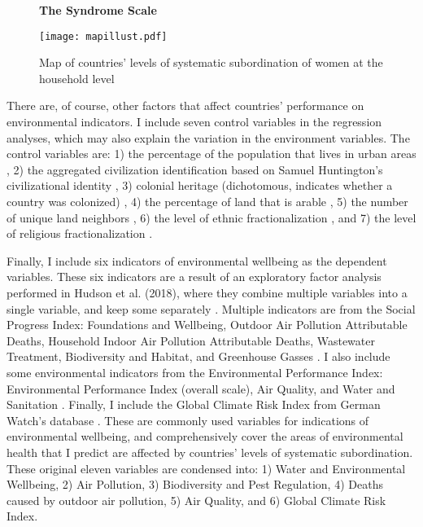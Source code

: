 \documentclass[letterpaper,10.5pt]{article}
\begin{document}
\begin{figure}
  \begin{centering}
  \textbf{The Syndrome Scale}\par\medskip
  \texttt{[image: mapillust.pdf]}
  \caption{Map of countries' levels of systematic subordination of women at the household level}
  \label{SynMap}
    \end{centering}
\end{figure}

There are, of course, other factors that affect countries' performance on environmental indicators. I include seven control variables in the regression analyses, which may also explain the variation in the environment variables. The control variables are: 1) the percentage of the population that lives in urban areas \cite{WB2015}, 2) the aggregated civilization identification based on Samuel Huntington's civilizational identity \cite{Huntington}, 3) colonial heritage (dichotomous, indicates whether a country was colonized) \cite{Hudson}, 4) the percentage of land that is arable \cite{WB2015}, 5) the number of unique land neighbors \cite{Wiki2018}, 6) the level of ethnic fractionalization \cite{Alesina}, and 7) the level of religious fractionalization \cite{Alesina}. 

Finally, I include six indicators of environmental wellbeing as the dependent variables. These six indicators are a result of an exploratory factor analysis performed in Hudson et al. (2018), where they combine multiple variables into a single variable, and keep some separately \cite{Hudson}. Multiple indicators are from the Social Progress Index: Foundations and Wellbeing, Outdoor Air Pollution Attributable Deaths, Household Indoor Air Pollution Attributable Deaths, Wastewater Treatment, Biodiversity and Habitat, and Greenhouse Gasses \cite{spi}. I also include some environmental indicators from the Environmental Performance Index: Environmental Performance Index (overall scale), Air Quality, and Water and Sanitation \cite{epi}. Finally, I include the Global Climate Risk Index from German Watch's database \cite{gcri}. These are commonly used variables for indications of environmental wellbeing, and comprehensively cover the areas of environmental health that I predict are affected by countries' levels of systematic subordination. These original eleven variables are condensed into: 1) Water and Environmental Wellbeing, 2) Air Pollution, 3) Biodiversity and Pest Regulation, 4) Deaths caused by outdoor air pollution, 5) Air Quality, and 6) Global Climate Risk Index.
\end{document}

